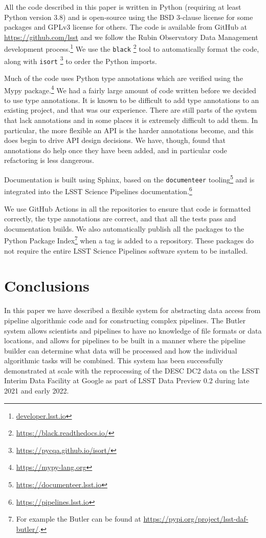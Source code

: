 \documentclass[]{spie}
\begin{document}
\setcounter{footnote}{0}  %

All the code described in this paper is written in Python (requiring at least Python version 3.8\cite{2020ASPC..522..541J}) and is open-source using the BSD 3-clause license for some packages and GPLv3 license for others.
The code is available from GitHub at \url{https://github.com/lsst} and we follow the Rubin Observatory Data Management development process.\footnote{\url{developer.lsst.io}}\cite{2018SPIE10707E..09J}
We use the \texttt{black} \footnote{\url{https://black.readthedocs.io/}} tool to automatically format the code, along with \texttt{isort} \footnote{\url{https://pycqa.github.io/isort/}} to order the Python imports.

Much of the code uses Python type annotations which are verified using the Mypy package.\footnote{\url{https://mypy-lang.org}}
We had a fairly large amount of code written before we decided to use type annotations.
It is known to be difficult to add type annotations to an existing project\cite{10.1109/ASE51524.2021.9678947}, and that was our experience.
There are still parts of the system that lack annotations and in some places it is extremely difficult to add them.
In particular, the more flexible an API is the harder annotations become, and this does begin to drive API design decisions.
We have, though, found that annotations do help once they have been added, and in particular code refactoring is less dangerous.

Documentation is built using Sphinx, based on the \texttt{documenteer} tooling\footnote{\url{https://documenteer.lsst.io}} and is integrated into the LSST Science Pipelines documentation.\footnote{\url{https://pipelines.lsst.io}}

We use GitHub Actions in all the repositories to ensure that code is formatted correctly, the type annotations are correct, and that all the tests pass and documentation builds.
We also automatically publish all the packages to the Python Package Index\footnote{For example the Butler can be found at \url{https://pypi.org/project/lsst-daf-butler/}.} when a tag is added to a repository.
These packages do not require the entire LSST Science Pipelines software system to be installed.

\section{Conclusions}

In this paper we have described a flexible system for abstracting data access from pipeline algorithmic code and for constructing complex pipelines.
The Butler system allows scientists and pipelines to have no knowledge of file formats or data locations, and allows for pipelines to be built in a manner where the pipeline builder can determine what data will be processed and how the individual algorithmic tasks will be combined.
This system has been successfully demonstrated at scale with the reprocessing of the DESC DC2 data\cite{2021ApJS..253...31L} on the LSST Interim Data Facility at Google \cite{2021arXiv211115030O} as part of LSST Data Preview 0.2 \cite{RTN-001} during late 2021 and early 2022.
\end{document}
